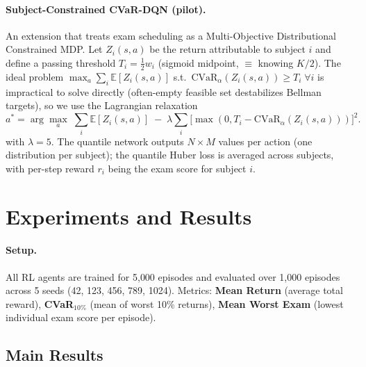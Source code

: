 \documentclass[a4paper,11pt]{article}
\theoremstyle{definition}
\begin{document}
\paragraph{Subject-Constrained CVaR-DQN (pilot).}\label{sec:sc_cvar_dqn} An extension that treats exam scheduling as a Multi-Objective Distributional Constrained MDP. Let $Z_i(s, a)$ be the return attributable to subject $i$ and define a passing threshold $T_i = \tfrac{1}{2} w_i$ (sigmoid midpoint, $\equiv$ knowing $K/2$). The ideal problem
$\max_a \sum_i \mathbb{E}[Z_i(s, a)]$ s.t.\ $\text{CVaR}_\alpha(Z_i(s, a)) \geq T_i \;\forall i$
is impractical to solve directly (often-empty feasible set destabilizes Bellman targets), so we use the Lagrangian relaxation
\begin{equation}
    a^* = \arg\max_a \; \sum_i \mathbb{E}[Z_i(s, a)] \; - \; \lambda \sum_i \bigl[\max(0, T_i - \text{CVaR}_\alpha(Z_i(s, a)))\bigr]^2.
    \label{eq:sc_cvar_lagrangian}
\end{equation}
with $\lambda = 5$. The quantile network outputs $N \times M$ values per action (one distribution per subject); the quantile Huber loss is averaged across subjects, with per-step reward $r_i$ being the exam score for subject $i$.

\section{Experiments and Results}
\label{sec:experiments}

\paragraph{Setup.} All RL agents are trained for 5{,}000 episodes and evaluated over 1{,}000 episodes across 5 seeds (42, 123, 456, 789, 1024). Metrics: \textbf{Mean Return} (average total reward), \textbf{CVaR$_{10\%}$} (mean of worst 10\% returns), \textbf{Mean Worst Exam} (lowest individual exam score per episode).

\subsection{Main Results}
\end{document}

